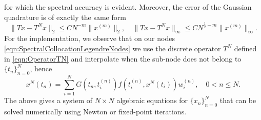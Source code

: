 \documentclass[12pt,a4paper]{article}
\begin{document}
for which the spectral accuracy is evident. Moreover, the error of the Gaussian quadrature is of exactly the same form
\begin{equation}\label{eqn:GaussianQuadratureError}
	\|Tx - T^N x\|_2 \leq C N^{-m} \|x^{(m)}\|_2, \quad \|Tx - T^N x\|_\infty \leq C N^{\frac{1}{2}-m} \|x^{(m)}\|_\infty.
\end{equation}
For the implementation, we observe that on our nodes \eqref{eqn:SpectralCollocationLegendreNodes} we use the discrete operator $T^N$ defined in \eqref{eqn:OperatorTN} and interpolate when the sub-node does not belong to $\{t_n\}_{n=0}^N$, hence 
\begin{equation}
	x^N(t_n) = \sum_{i=1}^N G(t_n, t_i^{(n)}) f(t_i^{(n)}, x^N(t_i)) w_i^{(n)}, \quad 0< n \leq N.
\end{equation}
The above gives a system of $N\times N$ algebraic equations for $\{x_n\}_{n=0}^N$ that can be solved numerically using Newton or fixed-point iterations. 
\end{document}
